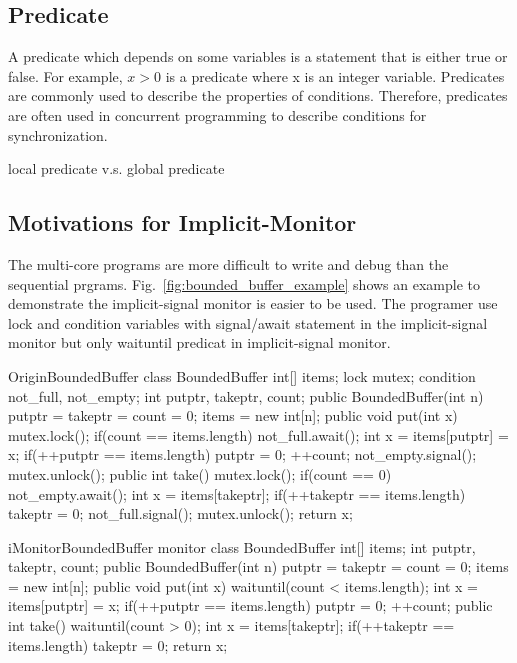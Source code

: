 \documentclass[preprint]{sigplanconf}
\begin{document}
\subsection{Predicate}
A predicate which depends on some variables is a statement that is either true or 
false. For example, $x > 0$ is a predicate where x is an integer variable. Predicates are 
commonly used to describe the properties of conditions. Therefore, predicates are often 
used in concurrent programming to describe conditions for synchronization.

local predicate v.s. global predicate

\subsection{Motivations for Implicit-Monitor}
The multi-core programs are more difficult to write and debug than the 
sequential prgrams. 
Fig.~\ref{fig:bounded_buffer_example} shows an example to demonstrate the
implicit-signal monitor is easier to be used. The programer use lock and 
condition variables with signal/await statement in the implicit-signal monitor
but only waituntil predicat in implicit-signal monitor. 

\begin{SaveVerbatim}{OriginBoundedBuffer}
class BoundedBuffer {
  int[] items;  
  lock mutex;
  condition not_full, not_empty;
  int putptr, takeptr, count;
  public BoundedBuffer(int n) {
    putptr = takeptr = count = 0;
    items = new int[n];
  } 
  public void put(int x) {
    mutex.lock();
    if(count == items.length) {
      not_full.await();
    }
    int x = items[putptr] = x;
    if(++putptr == items.length) {
      putptr = 0;
    }
    ++count;
    not_empty.signal();
    mutex.unlock();
  }
  public int take() {
    mutex.lock();
    if(count == 0) {
      not_empty.await();
    }
    int x = items[takeptr];
    if(++takeptr == items.length) {
      takeptr = 0;
    }
    not_full.signal();
    mutex.unlock();
    return x;
  }
}
\end{SaveVerbatim}

\begin{SaveVerbatim}{iMonitorBoundedBuffer}
monitor class BoundedBuffer { 
  int[] items; 
  int putptr, takeptr, count; 
  public BoundedBuffer(int n) { 
    putptr = takeptr = count = 0; 
    items = new int[n]; 
  } 
  public void put(int x) { 
    waituntil(count < items.length); 
    int x = items[putptr] = x; 
    if(++putptr == items.length) { 
      putptr = 0; 
    } 
    ++count; 
  } 
  public int take() { 
    waituntil(count > 0); 
    int x = items[takeptr]; 
    if(++takeptr == items.length) { 
      takeptr = 0; 
    }
    return x;
  }
}
\end{SaveVerbatim}
\end{document}
